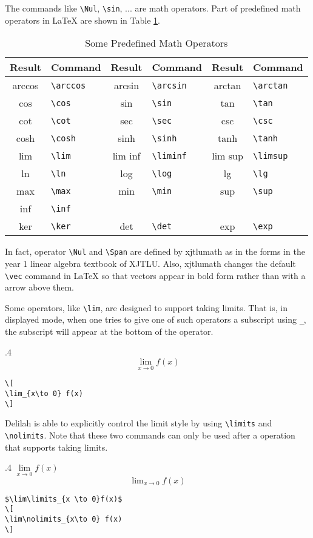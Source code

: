 The commands like \verb=\Nul=, \verb=\sin=, ... are math operators. Part of predefined math operators in \LaTeX{} are shown in Table \ref{tab:predefmathop}.
\begin{table}[hbpt]
\begin{center}
\small
\begin{tabular}{cl|cl|cl}
Result & Command & Result & Command & Result & Command \\
\hline
arccos & \verb=\arccos= & arcsin & \verb=\arcsin= & arctan & \verb=\arctan= \\
cos & \verb=\cos= & sin & \verb=\sin= & tan & \verb=\tan= \\
cot & \verb=\cot= & sec & \verb=\sec= & csc & \verb=\csc= \\
cosh & \verb=\cosh= & sinh & \verb=\sinh= & tanh & \verb=\tanh= \\
lim & \verb=\lim= & lim inf & \verb=\liminf= & lim sup & \verb=\limsup= \\
ln & \verb=\ln= & log & \verb=\log= & lg & \verb=\lg= \\
max & \verb=\max= & min & \verb=\min= & sup & \verb=\sup= \\
inf & \verb=\inf= &  &  &  &  \\
ker & \verb=\ker= & det & \verb=\det= & exp & \verb=\exp= 
\end{tabular}
\end{center}
\caption{Some Predefined Math Operators}
\label{tab:predefmathop}
\end{table}

In fact, operator \verb=\Nul= and \verb=\Span= are defined by xjtlumath as in the forms in the year 1 linear algebra textbook of XJTLU. Also, xjtlumath changes the default \verb=\vec= command in \LaTeX{} so that vectors appear in bold form rather than with a arrow above them.

Some operators, like \verb=\lim=, are designed to support taking limits. That is, in displayed mode, when one tries to give one of such operators a subscript using \verb=_=, the subscript will appear at the bottom of the operator.
\begin{parexammar}{.4\textandmarginlen}{
\[
\lim_{x\to 0} f(x)
\]
}
\begin{lstlisting}
\[
\lim_{x\to 0} f(x)
\]
\end{lstlisting}
\end{parexammar}

Delilah is able to explicitly control the limit style by using \verb=\limits= and \verb=\nolimits=. Note that these two commands can only be used after a operation that supports taking limits.
\begin{parexammar}{.4\textandmarginlen}{
$\lim\limits_{x \to 0}f(x)$
\[
\lim\nolimits_{x\to 0} f(x)
\]
}
\begin{lstlisting}
$\lim\limits_{x \to 0}f(x)$
\[
\lim\nolimits_{x\to 0} f(x)
\]
\end{lstlisting}
\end{parexammar}

